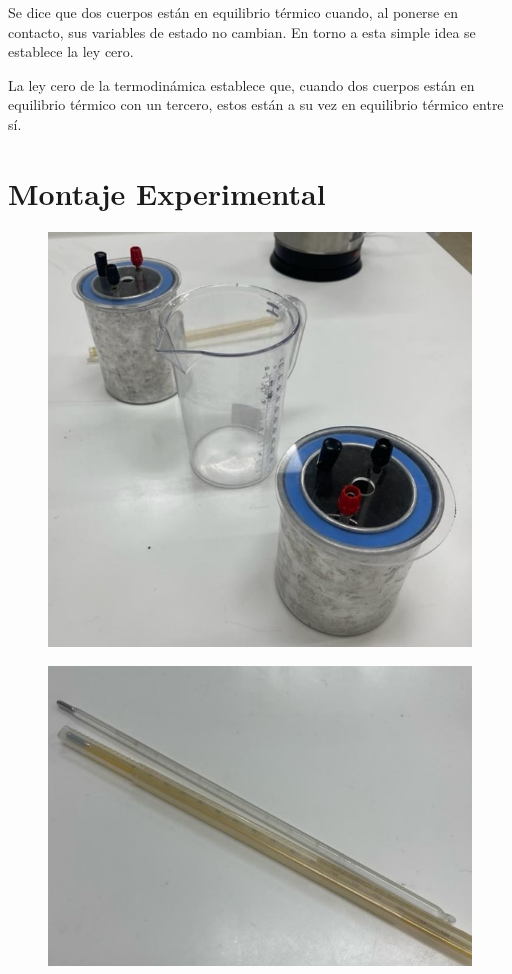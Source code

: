 \documentclass[letterpaper, 12pt]{article}
\begin{document}
Se dice que dos cuerpos están en equilibrio térmico cuando,
al ponerse en contacto, sus variables de estado no cambian.
En torno a esta simple idea se establece la ley cero.

La ley cero de la termodinámica establece que, cuando dos
cuerpos están en equilibrio térmico con un tercero, estos
están a su vez en equilibrio térmico entre sí.

\section{Montaje Experimental}

\begin{figure}[H]
      \begin{center}
            \includegraphics[width=.5\linewidth]{./Images/Montaje1.jpg}
            \caption{}
      \end{center}
\end{figure}

\begin{figure}[H]
      \begin{center}
            \includegraphics[width=.5\linewidth]{./Images/Montaje2.jpg}
            \caption{}
      \end{center}
\end{figure}
\end{document}
